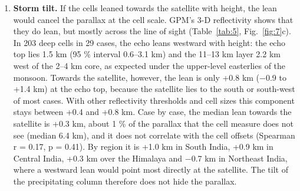 \begin{enumerate}
  \textbf{No single translation centres both measures.} The field and cell measures differ by 2--3 km in the raw and coastline-navigation states, and by about 5 km once the navigation is fitted to the cells. Navigation alone therefore cannot explain the result: the two measures see different parts of the storm (below). The east component of the fitted value also disagrees with ISRO's reports, which point west.
\item
  \textbf{Storm tilt.} If the cells leaned towards the satellite with height, the lean would cancel the parallax at the cell scale. GPM's 3-D reflectivity shows that they do lean, but mostly across the line of sight (Table~\ref{tab:5}, Fig.~\ref{fig:7}c). In 203 deep cells in 29 cases, the echo leans westward with height: the echo top lies 1.5 km (95 \% interval 0.6--3.1 km) and the 11--13 km layer 2.2 km west of the 2--4 km core, as expected under the upper-level easterlies of the monsoon. Towards the satellite, however, the lean is only +0.8 km (−0.9 to +1.4 km) at the echo top, because the satellite lies to the south or south-west of most cases. With other reflectivity thresholds and cell sizes this component stays between +0.4 and +0.8 km. Case by case, the median lean towards the satellite is +0.3 km, about 1 \% of the parallax that the cell measure does not see (median 6.4 km), and it does not correlate with the cell offsets (Spearman r = 0.17, p = 0.41). By region it is +1.0 km in South India, +0.9 km in Central India, +0.3 km over the Himalaya and −0.7 km in Northeast India, where a westward lean would point most directly at the satellite. The tilt of the precipitating column therefore does not hide the parallax.
\end{enumerate}

